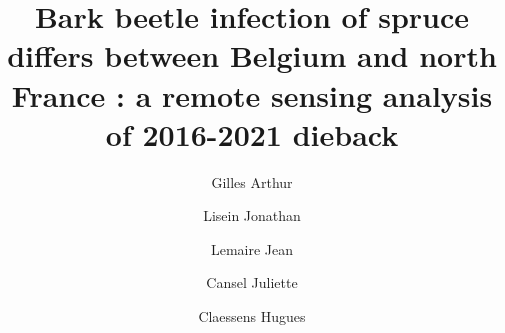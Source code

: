 \documentclass[3p,times]{elsarticle}
\begin{document}
\begin{frontmatter}


\author[label2]{Gilles Arthur}
\author[label2]{Lisein Jonathan}
\author[label3]{Lemaire Jean}
\author[label3]{Cansel Juliette}
\author[label2]{Claessens Hugues}




\title{Bark beetle infection of spruce differs between Belgium and north France : a remote sensing analysis of 2016-2021 dieback}


\end{frontmatter}
\end{document}
